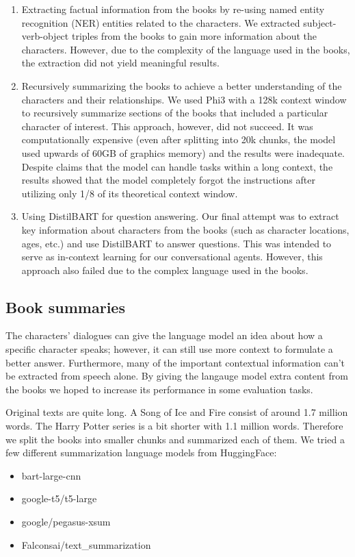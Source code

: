 \documentclass[fleqn,moreauthors,10pt]{ds_report}
\begin{document}
\begin{enumerate}
	\item Extracting factual information from the books by re-using named entity recognition (NER) entities related to the characters. We extracted subject-verb-object triples from the books to gain more information about the characters. However, due to the complexity of the language used in the books, the extraction did not yield meaningful results.

	\item  {} Recursively summarizing the books to achieve a better understanding of the characters and their relationships. We used Phi3 with a 128k context window to recursively summarize sections of the books that included a particular character of interest. This approach, however, did not succeed. It was computationally expensive (even after splitting into 20k chunks, the model used upwards of 60GB of graphics memory) and the results were inadequate. Despite claims that the model can handle tasks within a long context, the results showed that the model completely forgot the instructions after utilizing only 1/8 of its theoretical context window.

	\item Using DistilBART for question answering. Our final attempt was to extract key information about characters from the books (such as character locations, ages, etc.) and use DistilBART to answer questions. This was intended to serve as in-context learning for our conversational agents. However, this approach also failed due to the complex language used in the books.

\end{enumerate}

\subsection*{Book summaries}
The characters' dialogues can give the language model an idea about how a specific character speaks; however, it can still use more context to formulate a better answer.
Furthermore, many of the important contextual information can't be extracted from speech alone.
By giving the langauge model extra content from the books we hoped to increase its performance in some evaluation tasks.

Original texts are quite long. A Song of Ice and Fire consist of around 1.7 million words. The Harry Potter series is a bit shorter with 1.1 million words. Therefore we split the books into smaller chunks and summarized each of them. We tried a few different summarization language models from HuggingFace:
\begin{itemize}
	\item bart-large-cnn
	\item google-t5/t5-large
	\item google/pegasus-xsum
	\item Falconsai/text\_summarization
\end{itemize}
\end{document}

